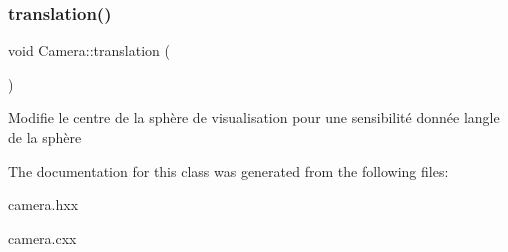 \subsubsection{\texorpdfstring{translation()}{translation()}}
{\footnotesize\ttfamily void Camera\+::translation (\begin{DoxyParamCaption}{ }\end{DoxyParamCaption})}

Modifie le centre de la sphère de visualisation pour une sensibilité donnée l\textquotesingle{}angle de la sphère 

The documentation for this class was generated from the following files\+:\begin{DoxyCompactItemize}
\item 
camera.\+hxx\item 
camera.\+cxx\end{DoxyCompactItemize}
